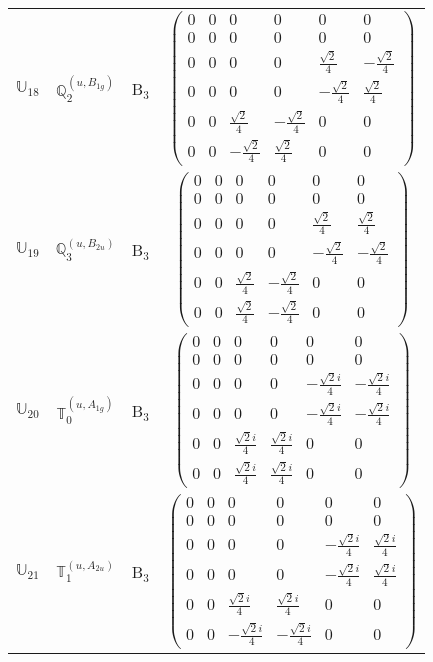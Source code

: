 \documentclass[fleqn,10pt,landscape]{article}
\begin{document}
\begin{itemize}
\begin{center}
\begin{longtable}{c|c|c|c}
$ \mathbb{U}_{18} $ & $\mathbb{Q}_{2}^{(u,B_{1g})}$ & B$_{3}$ & $\begin{pmatrix} 0 & 0 & 0 & 0 & 0 & 0 \\ 0 & 0 & 0 & 0 & 0 & 0 \\ 0 & 0 & 0 & 0 & \frac{\sqrt{2}}{4} & - \frac{\sqrt{2}}{4} \\ 0 & 0 & 0 & 0 & - \frac{\sqrt{2}}{4} & \frac{\sqrt{2}}{4} \\ 0 & 0 & \frac{\sqrt{2}}{4} & - \frac{\sqrt{2}}{4} & 0 & 0 \\ 0 & 0 & - \frac{\sqrt{2}}{4} & \frac{\sqrt{2}}{4} & 0 & 0 \end{pmatrix}$ \\
$ \mathbb{U}_{19} $ & $\mathbb{Q}_{3}^{(u,B_{2u})}$ & B$_{3}$ & $\begin{pmatrix} 0 & 0 & 0 & 0 & 0 & 0 \\ 0 & 0 & 0 & 0 & 0 & 0 \\ 0 & 0 & 0 & 0 & \frac{\sqrt{2}}{4} & \frac{\sqrt{2}}{4} \\ 0 & 0 & 0 & 0 & - \frac{\sqrt{2}}{4} & - \frac{\sqrt{2}}{4} \\ 0 & 0 & \frac{\sqrt{2}}{4} & - \frac{\sqrt{2}}{4} & 0 & 0 \\ 0 & 0 & \frac{\sqrt{2}}{4} & - \frac{\sqrt{2}}{4} & 0 & 0 \end{pmatrix}$ \\
$ \mathbb{U}_{20} $ & $\mathbb{T}_{0}^{(u,A_{1g})}$ & B$_{3}$ & $\begin{pmatrix} 0 & 0 & 0 & 0 & 0 & 0 \\ 0 & 0 & 0 & 0 & 0 & 0 \\ 0 & 0 & 0 & 0 & - \frac{\sqrt{2} i}{4} & - \frac{\sqrt{2} i}{4} \\ 0 & 0 & 0 & 0 & - \frac{\sqrt{2} i}{4} & - \frac{\sqrt{2} i}{4} \\ 0 & 0 & \frac{\sqrt{2} i}{4} & \frac{\sqrt{2} i}{4} & 0 & 0 \\ 0 & 0 & \frac{\sqrt{2} i}{4} & \frac{\sqrt{2} i}{4} & 0 & 0 \end{pmatrix}$ \\
$ \mathbb{U}_{21} $ & $\mathbb{T}_{1}^{(u,A_{2u})}$ & B$_{3}$ & $\begin{pmatrix} 0 & 0 & 0 & 0 & 0 & 0 \\ 0 & 0 & 0 & 0 & 0 & 0 \\ 0 & 0 & 0 & 0 & - \frac{\sqrt{2} i}{4} & \frac{\sqrt{2} i}{4} \\ 0 & 0 & 0 & 0 & - \frac{\sqrt{2} i}{4} & \frac{\sqrt{2} i}{4} \\ 0 & 0 & \frac{\sqrt{2} i}{4} & \frac{\sqrt{2} i}{4} & 0 & 0 \\ 0 & 0 & - \frac{\sqrt{2} i}{4} & - \frac{\sqrt{2} i}{4} & 0 & 0 \end{pmatrix}$ \\

\end{longtable}
\end{center}
\end{itemize}
\end{document}
